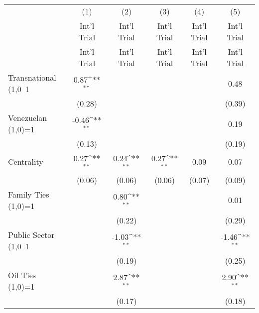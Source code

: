 {
\def\sym#1{\ifmmode^{#1}\else\(^{#1}\)\fi}
\begin{tabular}{l*{5}{c}}
\hline\hline
                    &\multicolumn{1}{c}{(1)}&\multicolumn{1}{c}{(2)}&\multicolumn{1}{c}{(3)}&\multicolumn{1}{c}{(4)}&\multicolumn{1}{c}{(5)}\\
                    &\multicolumn{1}{c}{Int'l Trial}&\multicolumn{1}{c}{Int'l Trial}&\multicolumn{1}{c}{Int'l Trial}&\multicolumn{1}{c}{Int'l Trial}&\multicolumn{1}{c}{Int'l Trial}\\
                    & Int'l Trial        & Int'l Trial        & Int'l Trial        & Int'l Trial        & Int'l Trial        \\

Transnational (1,0~1&        0.87\sym{**}&                    &                    &                    &        0.48        \\
                    &      (0.28)        &                    &                    &                    &      (0.39)        \\
Venezuelan (1,0)=1  &       -0.46\sym{**}&                    &                    &                    &        0.19        \\
                    &      (0.13)        &                    &                    &                    &      (0.19)        \\
Centrality          &        0.27\sym{**}&        0.24\sym{**}&        0.27\sym{**}&        0.09        &        0.07        \\
                    &      (0.06)        &      (0.06)        &      (0.06)        &      (0.07)        &      (0.09)        \\
Family Ties (1,0)=1 &                    &        0.80\sym{**}&                    &                    &        0.01        \\
                    &                    &      (0.22)        &                    &                    &      (0.29)        \\
Public Sector (1,0~1&                    &       -1.03\sym{**}&                    &                    &       -1.46\sym{**}\\
                    &                    &      (0.19)        &                    &                    &      (0.25)        \\
Oil Ties (1,0)=1    &                    &        2.87\sym{**}&                    &                    &        2.90\sym{**}\\
                    &                    &      (0.17)        &                    &                    &      (0.18)        \\

\end{tabular}}
